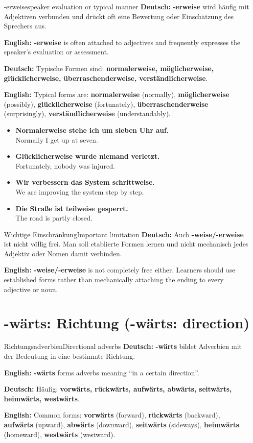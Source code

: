\documentclass[a4paper,11pt]{article}
\newcommand{\GermanText}[1]{\textbf{Deutsch: }#1\par}
\newcommand{\EnglishText}[1]{{\small\color{SoftGray}\textbf{English: }#1\par}}
\newcommand{\ExampleItem}[2]{\item \textbf{#1}\\{\small\color{SoftGray}#2}}
\newcommand{\BSection}[2]{\section{#1 \textnormal{\small (#2)}}}
\begin{document}
\begin{grammarentry}{-erweise}{speaker evaluation or typical manner}
\GermanText{\textbf{-erweise} wird häufig mit Adjektiven verbunden und drückt oft eine Bewertung oder Einschätzung des Sprechers aus.}
\EnglishText{\textbf{-erweise} is often attached to adjectives and frequently expresses the speaker's evaluation or assessment.}

\GermanText{Typische Formen sind: \textbf{normalerweise, möglicherweise, glücklicherweise, überraschenderweise, verständlicherweise}.}
\EnglishText{Typical forms are: \textbf{normalerweise} (normally), \textbf{möglicherweise} (possibly), \textbf{glücklicherweise} (fortunately), \textbf{überraschenderweise} (surprisingly), \textbf{verständlicherweise} (understandably).}
\end{grammarentry}

\begin{exbox}
\begin{itemize}
\ExampleItem{Normalerweise stehe ich um sieben Uhr auf.}{Normally I get up at seven.}
\ExampleItem{Glücklicherweise wurde niemand verletzt.}{Fortunately, nobody was injured.}
\ExampleItem{Wir verbessern das System schrittweise.}{We are improving the system step by step.}
\ExampleItem{Die Straße ist teilweise gesperrt.}{The road is partly closed.}
\end{itemize}
\end{exbox}

\begin{grammarentry}{Wichtige Einschränkung}{Important limitation}
\GermanText{Auch \textbf{-weise/-erweise} ist nicht völlig frei. Man soll etablierte Formen lernen und nicht mechanisch jedes Adjektiv oder Nomen damit verbinden.}
\EnglishText{\textbf{-weise/-erweise} is not completely free either. Learners should use established forms rather than mechanically attaching the ending to every adjective or noun.}
\end{grammarentry}

\BSection{-wärts: Richtung}{-wärts: direction}

\begin{grammarentry}{Richtungsadverbien}{Directional adverbs}
\GermanText{\textbf{-wärts} bildet Adverbien mit der Bedeutung \glqq in eine bestimmte Richtung\grqq{}.}
\EnglishText{\textbf{-wärts} forms adverbs meaning ``in a certain direction''.}
\GermanText{Häufig: \textbf{vorwärts, rückwärts, aufwärts, abwärts, seitwärts, heimwärts, westwärts}.}
\EnglishText{Common forms: \textbf{vorwärts} (forward), \textbf{rückwärts} (backward), \textbf{aufwärts} (upward), \textbf{abwärts} (downward), \textbf{seitwärts} (sideways), \textbf{heimwärts} (homeward), \textbf{westwärts} (westward).}
\end{grammarentry}
\end{document}
